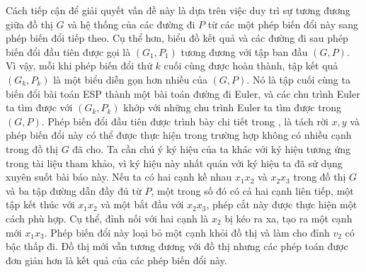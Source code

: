 \documentclass[14pt, a4paper]{article}
\numberwithin{equation}{section}
\numberwithin{figure}{section}
\numberwithin{dl}{section}
\numberwithin{md}{section}
\numberwithin{bd}{section}
\numberwithin{dn}{section}
\numberwithin{hq}{section}
\begin{document}
    Cách tiếp cận để giải quyết vấn đề này là dựa trên việc duy trì sự tương đương giữa đồ thị $G$ và hệ thống của các đường đi $P$ từ các một phép biến đổi này sang phép biến đổi tiếp theo.
    Cụ thể hơn, biểu đồ kết quả và các đường đi sau phép biến đổi đầu tiên được gọi là $(G_1, P_1)$ tương đương với tập ban đầu $(G, P)$.
    Vì vậy, mỗi khi phép biến đổi thứ $k$ cuối cùng được hoàn thành, tập kết quả $(G_k, P_k)$ là một biểu diễn gọn hơn nhiều của $(G, P)$.
    Nó là tập cuối cùng ta biến đổi bài toán ESP thành một bài toán đường đi Euler, và các chu trình Euler ta tìm được với $(G_k, P_k)$ khớp với những chu trình Euler ta tìm được trong $(G, P)$.
    Phép biến đổi đầu tiên được trình bày chi tiết trong \cite{pevzner2001eulerian}, \cite{pevzner2001new} là tách rời $x, y$ và phép biến đổi này có thể được thực hiện trong trường hợp không có nhiều cạnh trong đồ thị $G$ đã cho.
    Ta cần chú ý ký hiệu của ta khác với ký hiệu tương ứng trong tài liệu tham khảo, vì ký hiệu này nhất quán với ký hiệu ta đã sử dụng xuyên suốt bài báo này.
    Nếu ta có hai cạnh kề nhau $x_1 x_2$ và $x_2 x_3$ trong đồ thị $G$ và ba tập đường dẫn đầy đủ từ $P$, một trong số đó có cả hai cạnh liên tiếp, một tập kết thúc với $x_1 x_2$ và một bắt đầu với $x_2 x_3$, phép cắt này được thực hiện một cách phù hợp. Cụ thể, đỉnh nối với hai cạnh là $x_2$ bị kéo ra xa, tạo ra một cạnh mới $x_1 x_3$.
    Phép biến đổi này loại bỏ một cạnh khỏi đồ thị và làm cho đỉnh $v_2$ có bậc thấp đi.
    Đồ thị mới vẫn tương đương với đồ thị nhưng các phép toán được đơn giản hơn là kết quả của các phép biến đổi này.
    \newpage
    \printbibliography[title={TÀI LIỆU THAM KHẢO}]
\end{document}

